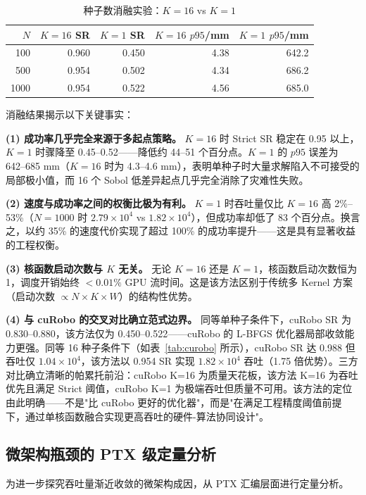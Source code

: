 \documentclass[twocolumn,a4paper,10pt]{ctexart}
\begin{document}
\begin{table}[htbp]
\centering
\caption{种子数消融实验：$K=16$ vs $K=1$}
\label{tab:ablation}
\footnotesize
\begin{tabular}{rrrrr}
\toprule
$N$ & $K{=}16$ SR & $K{=}1$ SR & $K{=}16$ $p95$/mm & $K{=}1$ $p95$/mm\\
\midrule
100  & 0.960 & 0.450 & 4.38  & 642.2\\
500  & 0.954 & 0.502 & 4.34  & 686.2\\
1000 & 0.954 & 0.522 & 4.56  & 685.0\\
\bottomrule
\end{tabular}
\end{table}

消融结果揭示以下关键事实：

\textbf{(1) 成功率几乎完全来源于多起点策略。} $K=16$ 时 Strict SR 稳定在 0.95 以上，$K=1$ 时骤降至 0.45--0.52——降低约 44--51 个百分点。$K=1$ 的 $p95$ 误差为 642--685 mm（$K=16$ 时为 4.3--4.6 mm），表明单种子时大量求解陷入不可接受的局部极小值，而 16 个 Sobol 低差异起点几乎完全消除了灾难性失败。

\textbf{(2) 速度与成功率之间的权衡比极为有利。} $K=1$ 时吞吐量仅比 $K=16$ 高 2\%--53\%（$N=1000$ 时 $2.79\times10^4$ vs $1.82\times10^4$），但成功率却低了 83 个百分点。换言之，以约 35\% 的速度代价实现了超过 100\% 的成功率提升——这是具有显著收益的工程权衡。

\textbf{(3) 核函数启动次数与 $K$ 无关。} 无论 $K=16$ 还是 $K=1$，核函数启动次数恒为 1，调度开销始终 $<0.01\%$ GPU 流时间。这是该方法区别于传统多 Kernel 方案（启动次数 $\propto N\times K\times W$）的结构性优势。

\textbf{(4) 与 cuRobo 的交叉对比确立范式边界。} 同等单种子条件下，cuRobo SR 为 0.830--0.880，该方法仅为 0.450--0.522——cuRobo 的 L-BFGS 优化器局部收敛能力更强。同等 16 种子条件下（如表~\ref{tab:curobo} 所示），cuRobo SR 达 0.988 但吞吐仅 $1.04\times10^4$，该方法以 0.954 SR 实现 $1.82\times10^4$ 吞吐（1.75 倍优势）。三方对比确立清晰的帕累托前沿：cuRobo K=16 为质量天花板，该方法 K=16 为吞吐优先且满足 Strict 阈值，cuRobo K=1 为极端吞吐但质量不可用。该方法的定位由此明确——不是"比 cuRobo 更好的优化器"，而是"在满足工程精度阈值前提下，通过单核函数融合实现更高吞吐的硬件-算法协同设计"。

\subsection{微架构瓶颈的 PTX 级定量分析}

为进一步探究吞吐量渐近收敛的微架构成因，从 PTX 汇编层面进行定量分析。
\end{document}
